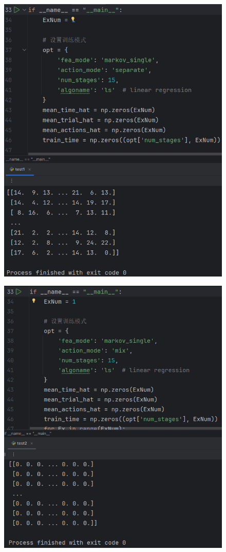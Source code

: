 \documentclass[12pt,a4paper]{ctexart}
\theoremstyle{definition}
\begin{document}
\begin{figure}[H]
    \includegraphics[scale=0.4]{1.png}
    \centering
\end{figure}
\begin{figure}[H]
    \includegraphics[scale=0.4]{2.png}
    \centering
\end{figure}
\end{document}
